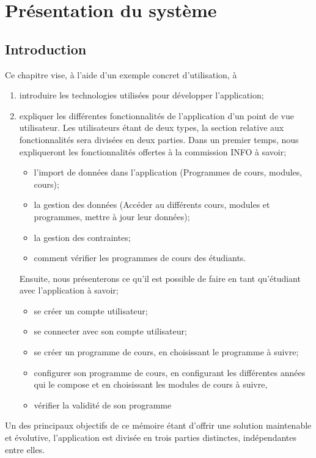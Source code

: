 \chapter{Présentation du système}
\label{présentation_système}
\section{Introduction}


Ce chapitre vise, à l'aide d'un exemple concret d'utilisation,  à 
\begin{enumerate}
\item introduire les technologies utilisées pour développer l'application;
\item expliquer les différentes fonctionnalités de l'application d'un point de vue utilisateur. Les utilisateurs étant de deux types, la section relative aux fonctionnalités sera divisées en deux parties. Dans un premier temps, nous expliqueront les fonctionnalités offertes à la commission INFO à savoir;
  \begin{itemize}
    \item l'import de données dans l'application (Programmes de cours, modules, cours);
    \item la gestion des données (Accéder au différents cours, modules et programmes, mettre à jour leur données);
    \item la gestion des contraintes;
    \item comment vérifier les programmes de cours des étudiants.
  \end{itemize}
Ensuite, nous présenterons ce qu'il est possible de faire en tant qu'étudiant avec l'application à savoir;
\begin{itemize}
  \item se créer un compte utilisateur;
  \item se connecter avec son compte utilisateur;
  \item se créer un programme de cours, en choisissant le programme à suivre;
  \item configurer son programme de cours, en configurant les différentes années qui le compose et en choisissant les modules de cours à suivre,
  \item vérifier la validité de son programme
\end{itemize}
 
\end{enumerate}

Un des principaux objectifs de ce mémoire étant d'offrir une solution maintenable et évolutive, l'application est divisée en trois parties distinctes, indépendantes entre elles. 

